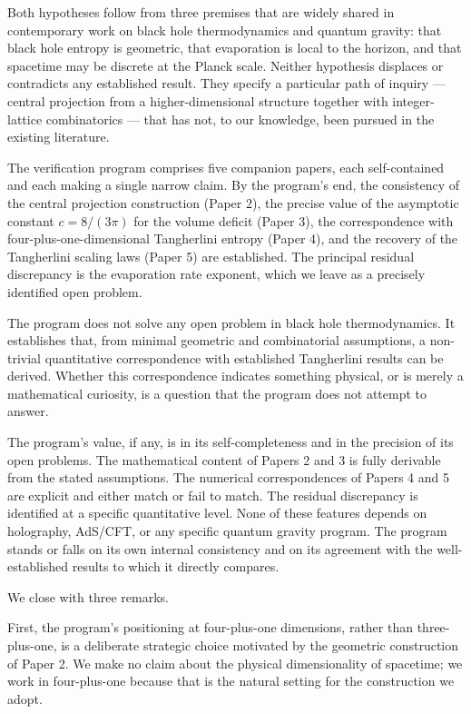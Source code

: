 \documentclass[a4paper,11pt]{article}
\theoremstyle{definition}
\begin{document}
Both hypotheses follow from three premises that are widely shared in
contemporary work on black hole thermodynamics and quantum gravity: that
black hole entropy is geometric, that evaporation is local to the
horizon, and that spacetime may be discrete at the Planck scale. Neither
hypothesis displaces or contradicts any established result. They specify
a particular path of inquiry --- central projection from a
higher-dimensional structure together with integer-lattice combinatorics
--- that has not, to our knowledge, been pursued in the existing
literature.

The verification program comprises five companion papers, each
self-contained and each making a single narrow claim. By the program's
end, the consistency of the central projection construction (Paper 2),
the precise value of the asymptotic constant \(c = 8/(3\pi)\) for the
volume deficit (Paper 3), the correspondence with
four-plus-one-dimensional Tangherlini entropy (Paper 4), and the
recovery of the Tangherlini scaling laws (Paper 5) are established. The
principal residual discrepancy is the evaporation rate exponent, which
we leave as a precisely identified open problem.

The program does not solve any open problem in black hole
thermodynamics. It establishes that, from minimal geometric and
combinatorial assumptions, a non-trivial quantitative correspondence
with established Tangherlini results can be derived. Whether this
correspondence indicates something physical, or is merely a mathematical
curiosity, is a question that the program does not attempt to answer.

The program's value, if any, is in its self-completeness and in the
precision of its open problems. The mathematical content of Papers 2 and
3 is fully derivable from the stated assumptions. The numerical
correspondences of Papers 4 and 5 are explicit and either match or fail
to match. The residual discrepancy is identified at a specific
quantitative level. None of these features depends on holography,
AdS/CFT, or any specific quantum gravity program. The program stands or
falls on its own internal consistency and on its agreement with the
well-established results to which it directly compares.

We close with three remarks.

First, the program's positioning at four-plus-one dimensions, rather
than three-plus-one, is a deliberate strategic choice motivated by the
geometric construction of Paper 2. We make no claim about the physical
dimensionality of spacetime; we work in four-plus-one because that is
the natural setting for the construction we adopt.
\end{document}
